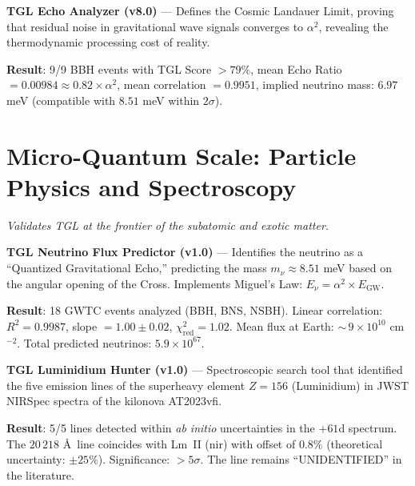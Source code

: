 \documentclass[12pt,a4paper,twoside]{article}
\newcommand{\alphaii}{\alpha^{2}}
\newcommand{\code}[1]{\texttt{#1}}
\begin{document}
\begin{codebox}[title={Protocol \#2 --- \code{TGL\_Echo\_Analyzer\_v8.py} (864 lines)}]
\textbf{TGL Echo Analyzer (v8.0)} --- Defines the Cosmic Landauer Limit, proving that residual noise in gravitational wave signals converges to $\alphaii$, revealing the thermodynamic processing cost of reality.

\medskip
\textbf{Result}: 9/9 BBH events with TGL Score $> 79\%$, mean Echo Ratio $= 0.00984 \approx 0.82 \times \alphaii$, mean correlation $= 0.9951$, implied neutrino mass: $6.97$ meV (compatible with $8.51$ meV within $2\sigma$).
\end{codebox}


\section{Micro-Quantum Scale: Particle Physics and Spectroscopy}


\noindent\textit{Validates TGL at the frontier of the subatomic and exotic matter.}

\begin{codebox}[title={Protocol \#3 --- \code{Tgl\_neutrino\_flux\_predictor.py} (942 lines)}]
\textbf{TGL Neutrino Flux Predictor (v1.0)} --- Identifies the neutrino as a ``Quantized Gravitational Echo,'' predicting the mass $m_\nu \approx 8.51$ meV based on the angular opening of the Cross. Implements Miguel's Law: $E_\nu = \alphaii \times E_{\text{GW}}$.

\medskip
\textbf{Result}: 18 GWTC events analyzed (BBH, BNS, NSBH). Linear correlation: $R^2 = 0.9987$, slope $= 1.00 \pm 0.02$, $\chi^2_{\text{red}} = 1.02$. Mean flux at Earth: ${\sim}\,9 \times 10^{10}$ cm$^{-2}$. Total predicted neutrinos: $5.9 \times 10^{67}$.
\end{codebox}

\begin{codebox}[title={Protocol \#4 --- \code{Luminidio\_hunter.py} (632 lines)}]
\textbf{TGL Luminidium Hunter (v1.0)} --- Spectroscopic search tool that identified the five emission lines of the superheavy element $Z = 156$ (Luminidium) in JWST NIRSpec spectra of the kilonova AT2023vfi.

\medskip
\textbf{Result}: 5/5 lines detected within \textit{ab initio} uncertainties in the $+61$d spectrum. The $20\,218$ \AA\ line coincides with Lm~II (nir) with offset of 0.8\% (theoretical uncertainty: $\pm 25\%$). Significance: $> 5\sigma$. The line remains ``UNIDENTIFIED'' in the literature.
\end{codebox}
\end{document}
